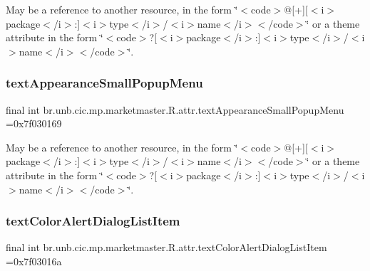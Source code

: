 May be a reference to another resource, in the form \char`\"{}$<$code$>$@\mbox{[}+\mbox{]}\mbox{[}$<$i$>$package$<$/i$>$\+:\mbox{]}$<$i$>$type$<$/i$>$/$<$i$>$name$<$/i$>$$<$/code$>$\char`\"{} or a theme attribute in the form \char`\"{}$<$code$>$?\mbox{[}$<$i$>$package$<$/i$>$\+:\mbox{]}$<$i$>$type$<$/i$>$/$<$i$>$name$<$/i$>$$<$/code$>$\char`\"{}. \mbox{\label{classbr_1_1unb_1_1cic_1_1mp_1_1marketmaster_1_1R_1_1attr_afb70fa144c5b4bd28e0f0187a5a425a7}} 
\subsubsection{\texorpdfstring{text\+Appearance\+Small\+Popup\+Menu}{textAppearanceSmallPopupMenu}}
{\footnotesize\ttfamily final int br.\+unb.\+cic.\+mp.\+marketmaster.\+R.\+attr.\+text\+Appearance\+Small\+Popup\+Menu =0x7f030169\hspace{0.3cm}{\ttfamily [static]}}

May be a reference to another resource, in the form \char`\"{}$<$code$>$@\mbox{[}+\mbox{]}\mbox{[}$<$i$>$package$<$/i$>$\+:\mbox{]}$<$i$>$type$<$/i$>$/$<$i$>$name$<$/i$>$$<$/code$>$\char`\"{} or a theme attribute in the form \char`\"{}$<$code$>$?\mbox{[}$<$i$>$package$<$/i$>$\+:\mbox{]}$<$i$>$type$<$/i$>$/$<$i$>$name$<$/i$>$$<$/code$>$\char`\"{}. \mbox{\label{classbr_1_1unb_1_1cic_1_1mp_1_1marketmaster_1_1R_1_1attr_a9baea4447d156e50ae9f6c6c8f8207c1}} 
\subsubsection{\texorpdfstring{text\+Color\+Alert\+Dialog\+List\+Item}{textColorAlertDialogListItem}}
{\footnotesize\ttfamily final int br.\+unb.\+cic.\+mp.\+marketmaster.\+R.\+attr.\+text\+Color\+Alert\+Dialog\+List\+Item =0x7f03016a\hspace{0.3cm}{\ttfamily [static]}}

